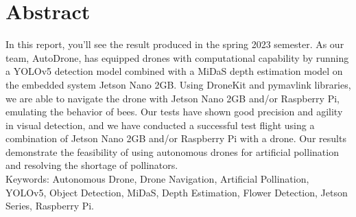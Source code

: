 \section*{Abstract}
In this report, you'll see the result produced in the spring 2023 semester. As our team, AutoDrone, has equipped drones with computational capability by running a YOLOv5 detection model combined with a MiDaS depth estimation model on the embedded system Jetson Nano 2GB. Using DroneKit and pymavlink libraries, we are able to navigate the drone with Jetson Nano 2GB and/or Raspberry Pi, emulating the behavior of bees. Our tests have shown good precision and agility in visual detection, and we have conducted a successful test flight using a combination of Jetson Nano 2GB and/or Raspberry Pi with a drone. Our results demonstrate the feasibility of using autonomous drones for artificial pollination and resolving the shortage of pollinators. \\

Keywords: Autonomous Drone, Drone Navigation, Artificial Pollination, YOLOv5, Object Detection, MiDaS, Depth Estimation, Flower Detection, Jetson Series, Raspberry Pi.